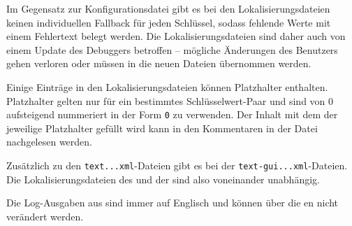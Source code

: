Im Gegensatz zur Konfigurationsdatei gibt es bei den Lokalisierungsdateien keinen individuellen Fallback für jeden Schlüssel, sodass fehlende Werte mit einem Fehlertext belegt werden. Die Lokalisierungsdateien sind daher auch von einem Update des Debuggers betroffen -- mögliche Änderungen des Benutzers gehen verloren oder müssen in die neuen Dateien übernommen werden.

Einige Einträge in den Lokalisierungsdateien können Platzhalter enthalten. Platzhalter gelten nur für ein bestimmtes Schlüsselwert-Paar und sind von $0$ aufsteigend nummeriert in der Form \texttt{{0}} zu verwenden. Der Inhalt mit dem der jeweilige Platzhalter gefüllt wird kann in den Kommentaren in der Datei nachgelesen werden.

Zusätzlich zu den \texttt{text...xml}-Dateien gibt es bei der \mdg \texttt{text-gui...xml}-Dateien. Die Lokalisierungsdateien des \md und der \mdg sind also voneinander unabhängig.

Die Log-Ausgaben aus  sind immer auf Englisch und können über die en nicht verändert werden.